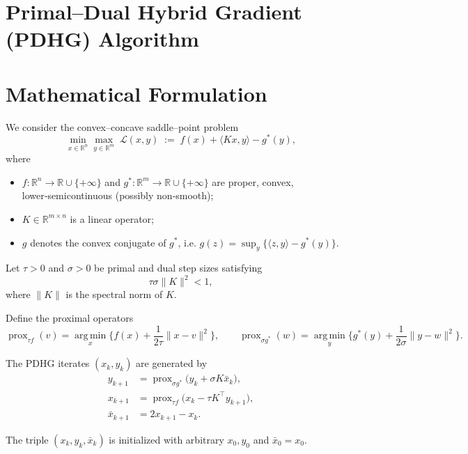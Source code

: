 \documentclass{article}
\newcommand{\prox}{\operatorname{prox}}
\newcommand{\argmin}{\operatorname*{arg\,min}}
\begin{document}
\section*{Primal–Dual Hybrid Gradient (PDHG) Algorithm}

\section*{Mathematical Formulation}
We consider the convex–concave saddle–point problem
\[
\min_{x\in\mathbb{R}^n}\max_{y\in\mathbb{R}^m}
\; \mathcal{L}(x,y)\;:=\; f(x)+\langle Kx,y\rangle-g^{*}(y),
\tag{1}
\]
where  

\begin{itemize}[noitemsep]
\item $f:\mathbb{R}^{n}\to\mathbb{R}\cup\{+\infty\}$ and $g^{*}:\mathbb{R}^{m}\to\mathbb{R}\cup\{+\infty\}$ are proper, convex, lower‑semicontinuous (possibly non‑smooth);
\item $K\in\mathbb{R}^{m\times n}$ is a linear operator;
\item $g$ denotes the convex conjugate of $g^{*}$, i.e. $g(z)=\sup_{y}\{\langle z,y\rangle-g^{*}(y)\}$.
\end{itemize}

Let $\tau>0$ and $\sigma>0$ be primal and dual step sizes satisfying
\[
\tau\sigma\|K\|^{2}<1,
\tag{2}
\]
where $\|K\|$ is the spectral norm of $K$.

Define the proximal operators
\[
\prox_{\tau f}(v)=\argmin_{x}\Big\{f(x)+\frac{1}{2\tau}\|x-v\|^{2}\Big\},
\qquad
\prox_{\sigma g^{*}}(w)=\argmin_{y}\Big\{g^{*}(y)+\frac{1}{2\sigma}\|y-w\|^{2}\Big\}.
\tag{3}
\]

The PDHG iterates $(x_{k},y_{k})$ are generated by
\[
\begin{aligned}
y_{k+1}&=\prox_{\sigma g^{*}}\!\bigl(y_{k}+\sigma K\bar{x}_{k}\bigr), \tag{4a}\\[4pt]
x_{k+1}&=\prox_{\tau f}\!\bigl(x_{k}-\tau K^{\top}y_{k+1}\bigr), \tag{4b}\\[4pt]
\bar{x}_{k+1}&=2x_{k+1}-x_{k}. \tag{4c}
\end{aligned}
\]

The triple $(x_{k},y_{k},\bar{x}_{k})$ is initialized with arbitrary $x_{0},y_{0}$ and $\bar{x}_{0}=x_{0}$.
\end{document}
